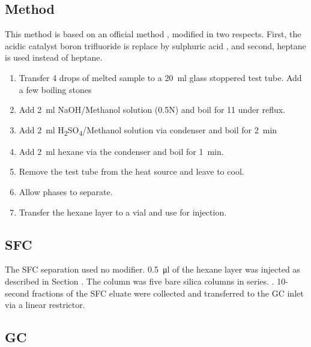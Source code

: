 \subsection{Method}

This method is based on an official method \autocite{AOCS2017}, modified in two
respects. First, the acidic catalyst boron trifluoride is replace by sulphuric
acid , and second, heptane is used instead of heptane.

\begin{enumerate}
  
\item Transfer \num{4} drops of melted sample to a \SI{20}{\milli\litre} glass
stoppered test tube. Add a few boiling stones

\item Add \SI{2}{\milli\litre} NaOH/Methanol solution (0.5N) and boil for
\SI{11}{\min} under reflux.

\item Add \SI{2}{\milli\litre} H\textsubscript{2}SO\textsubscript{4}/Methanol
solution via condenser and boil for \SI{2}{\minute}

\item  Add \SI{2}{\milli\litre} hexane via the condenser and boil for
\SI{1}{\minute}.

\item Remove the test tube from the heat source and leave to cool.

\item Allow phases to separate.

\item Transfer the hexane layer to a vial and use for injection.

\end{enumerate}

\subsection{SFC}

The SFC separation used no modifier. \SI{0.5}{\micro\litre} of the hexane layer
was injected as described in Section . The column was five bare
silica columns in series. . 10-second fractions of the SFC eluate were
collected and transferred to the GC inlet via a linear restrictor.


\subsection{GC}

